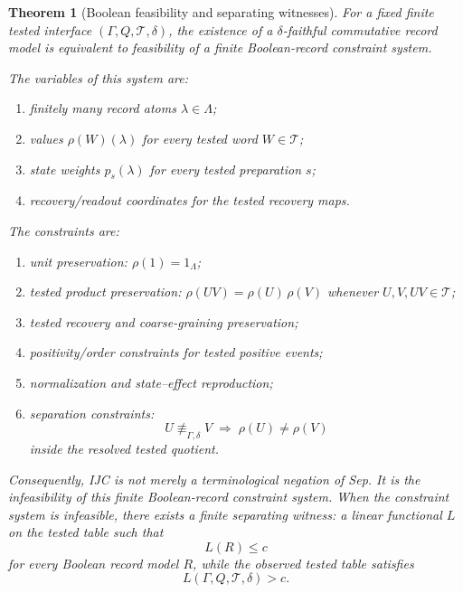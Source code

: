 \documentclass[11pt]{article}
\newtheorem{theorem}{Theorem}[section]
\begin{document}
\begin{theorem}[Boolean feasibility and separating witnesses]\label{thm:boolean-feasibility-separating-witnesses}
For a fixed finite tested interface $(\Gamma,Q,\mathcal T,\delta)$, the
existence of a $\delta$-faithful commutative record model is equivalent
to feasibility of a finite Boolean-record constraint system.

The variables of this system are:
\begin{enumerate}[label=(\roman*),leftmargin=2em]
\item finitely many record atoms $\lambda\in\Lambda$;
\item values $\rho(W)(\lambda)$ for every tested word
$W\in\mathcal T$;
\item state weights $p_s(\lambda)$ for every tested preparation $s$;
\item recovery/readout coordinates for the tested recovery maps.
\end{enumerate}
The constraints are:
\begin{enumerate}[label=(\arabic*),leftmargin=2em]
\item unit preservation: $\rho(1)=1_\Lambda$;
\item tested product preservation:
$\rho(UV)=\rho(U)\,\rho(V)$ whenever $U,V,UV\in\mathcal T$;
\item tested recovery and coarse-graining preservation;
\item positivity/order constraints for tested positive events;
\item normalization and state--effect reproduction;
\item separation constraints:
\[
    U\not\equiv_{\Gamma,\delta}V
    \;\Longrightarrow\;
    \rho(U)\neq\rho(V)
\]
inside the resolved tested quotient.
\end{enumerate}
Consequently, IJC is not merely a terminological negation of Sep.  It
is the infeasibility of this finite Boolean-record constraint system.
When the constraint system is infeasible, there exists a finite
\emph{separating witness}: a linear functional $L$ on the tested table
such that
\[
    L(R)\le c
\]
for every Boolean record model $R$, while the observed tested table
satisfies
\[
    L(\Gamma,Q,\mathcal T,\delta) > c.
\]
\end{theorem}
\end{document}
